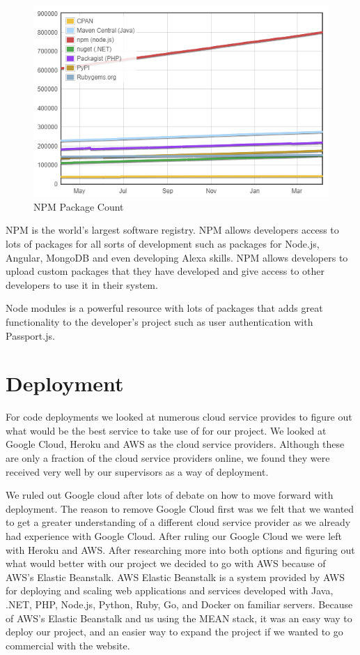 \begin{figure}[!htb]
  \includegraphics[width=\linewidth]{img/moduleCount.PNG}
  \caption{NPM Package Count}
  \label{fig:NPM}
\end{figure}

NPM is the world’s largest software registry. NPM allows developers access to lots of packages for all sorts of development such as packages for Node.js, Angular, MongoDB and even developing Alexa skills. NPM allows developers to upload custom packages that they have developed and give access to other developers to use it in their system.

Node modules is a powerful resource with lots of packages that adds great functionality to the developer's project such as user authentication with Passport.js.


\section{Deployment}
For code deployments we looked at numerous cloud service provides to figure out what would be the best service to take use of for our project. We looked at Google Cloud, Heroku and AWS as the cloud service providers. Although these are only a fraction of the cloud service providers online, we found they were received very well by our supervisors as a way of deployment. 

We ruled out Google cloud after lots of debate on how to move forward with deployment. The reason to remove Google Cloud first was we felt that we wanted to get a greater understanding of a different cloud service provider as we already had experience with Google Cloud. After ruling our Google Cloud we were left with Heroku and AWS. After researching more into both options and figuring out what would better with our project we decided to go with AWS because of AWS's Elastic Beanstalk. AWS Elastic Beanstalk is a system provided by AWS for deploying and scaling web applications and services developed with Java, .NET, PHP, Node.js, Python, Ruby, Go, and Docker on familiar servers.  Because of AWS's Elastic Beanstalk and us using the MEAN stack, it was an easy way to deploy our project, and an easier way to expand the project if we wanted to go commercial with the website.


